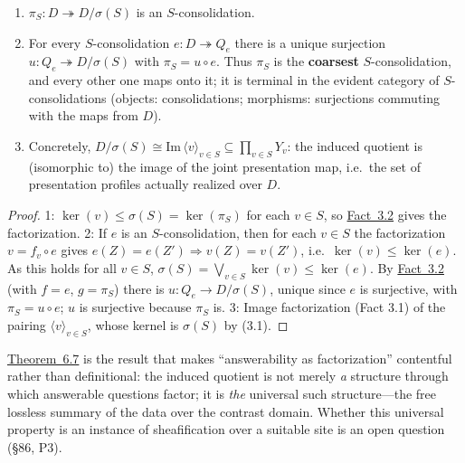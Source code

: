 \begin{thmplain}

\par\nopagebreak

\begin{enumerate}
\def\labelenumi{\arabic{enumi}.}
\tightlist
\item
  \(\pi_S : D \twoheadrightarrow D/\sigma(S)\) is an \(S\)-consolidation.
\item
  For every \(S\)-consolidation \(e : D \twoheadrightarrow Q_e\) there is a unique surjection \(u : Q_e \twoheadrightarrow D/\sigma(S)\) with \(\pi_S = u \circ e\). Thus \(\pi_S\) is the \textbf{coarsest} \(S\)-consolidation, and every other one maps onto it; it is terminal in the evident category of \(S\)-consolidations (objects: consolidations; morphisms: surjections commuting with the maps from \(D\)).
\item
  Concretely, \(D/\sigma(S) \cong \mathrm{Im}\, \langle v \rangle_{v \in S} \subseteq \prod_{v \in S} Y_v\): the induced quotient is (isomorphic to) the image of the joint presentation map, i.e.~the set of presentation profiles actually realized over \(D\).
\end{enumerate}
\end{thmplain}

\begin{proof}

1: \(\ker(v) \le \sigma(S) = \ker(\pi_S)\) for each \(v \in S\), so \hyperlink{stmt:3.2}{Fact~3.2} gives the factorization. 2: If \(e\) is an \(S\)-consolidation, then for each \(v \in S\) the factorization \(v = f_v \circ e\) gives \(e(Z) = e(Z') \Rightarrow v(Z) = v(Z')\), i.e.~\(\ker(v) \le \ker(e)\). As this holds for all \(v \in S\), \(\sigma(S) = \bigvee_{v \in S} \ker(v) \le \ker(e)\). By \hyperlink{stmt:3.2}{Fact~3.2} (with \(f = e\), \(g = \pi_S\)) there is \(u : Q_e \to D/\sigma(S)\), unique since \(e\) is surjective, with \(\pi_S = u \circ e\); \(u\) is surjective because \(\pi_S\) is. 3: Image factorization (Fact 3.1) of the pairing \(\langle v \rangle_{v \in S}\), whose kernel is \(\sigma(S)\) by (3.1).
\end{proof}

\hyperlink{stmt:6.7}{Theorem~6.7} is the result that makes ``answerability as factorization'' contentful rather than definitional: the induced quotient is not merely \emph{a} structure through which answerable questions factor; it is \emph{the} universal such structure---\hspace{0pt}the free lossless summary of the data over the contrast domain. Whether this universal property is an instance of sheafification over a suitable site is an open question (§86, P3).

